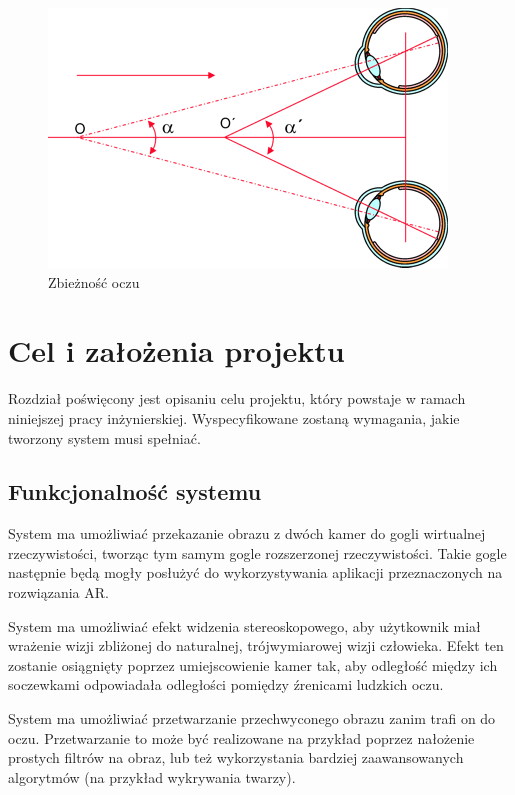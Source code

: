 \documentclass[a4paper,11pt,twoside]{report}
\theoremstyle{definition}
\begin{document}
\begin{figure}[h]
\centering
\includegraphics[scale=0.5]{images/zbieznosc}
\caption[Zbieżność oczu (źródło: http://www.swiatlo.tak.pl/1/index.php/funkcje-wzroku-akomodacja-adaptacja-zbieznosc/)]{Zbieżność oczu}
\end{figure}

\chapter{Cel i założenia projektu} %

Rozdział poświęcony jest opisaniu celu projektu, który powstaje w ramach niniejszej pracy inżynierskiej. Wyspecyfikowane zostaną wymagania, jakie tworzony system musi spełniać.

\section{Funkcjonalność systemu}

System ma umożliwiać przekazanie obrazu z dwóch kamer do gogli wirtualnej rzeczywistości, tworząc tym samym gogle rozszerzonej rzeczywistości. Takie gogle następnie będą mogły posłużyć do wykorzystywania aplikacji przeznaczonych na rozwiązania AR. 

System ma umożliwiać efekt widzenia stereoskopowego, aby użytkownik miał wrażenie wizji zbliżonej do naturalnej, trójwymiarowej wizji człowieka. Efekt ten zostanie osiągnięty poprzez umiejscowienie kamer tak, aby odległość między ich soczewkami odpowiadała odległości pomiędzy źrenicami ludzkich oczu. 

System ma umożliwiać przetwarzanie przechwyconego obrazu zanim trafi on do oczu. Przetwarzanie to może być realizowane na przykład poprzez nałożenie prostych filtrów na obraz, lub też wykorzystania bardziej zaawansowanych algorytmów (na przykład wykrywania twarzy).
\end{document}

